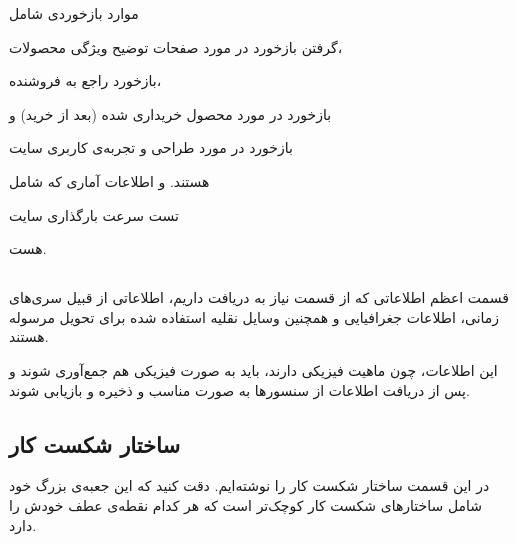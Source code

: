 موارد بازخوردی شامل
\begin{enumerate*}
\item گرفتن بازخورد در مورد صفحات توضیح ویژگی محصولات،
\item بازخورد راجع به فروشنده،
\item بازخورد در مورد محصول خریداری شده (بعد از خرید) و
\item بازخورد در مورد طراحی و تجربه‌ی کاربری سایت
\end{enumerate*} 
هستند. و اطلاعات آماری که شامل
\begin{enumerate*}
\item تست سرعت بارگذاری سایت
\end{enumerate*}
هست.

\subsection{}\label{ssec:shipment}
قسمت اعظم اطلاعاتی که از قسمت 
نیاز به دریافت داریم، اطلاعاتی از قبیل سری‌های زمانی، اطلاعات جغرافیایی و همچنین وسایل نقلیه استفاده شده برای تحویل مرسوله هستند.

این اطلاعات، چون ماهیت فیزیکی دارند، باید به صورت فیزیکی هم جمع‌آوری شوند و پس از دریافت اطلاعات از سنسور‌‌ها به صورت مناسب و  ذخیره و بازیابی شوند.

\subsection{ساختار شکست کار}
در این قسمت ساختار شکست کار‌ را نوشته‌ایم. دقت کنید که این جعبه‌ی بزرگ خود شامل ساختارهای شکست کار کوچک‌تر است که هر کدام نقطه‌ی عطف خودش را دارد.


